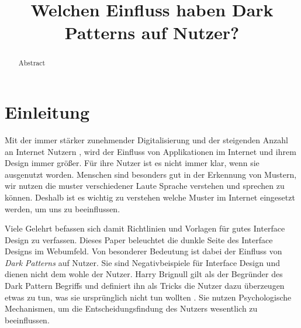 \documentclass[conference,compsoc,final,a4paper]{IEEEtran}
\newcommand{\autoren}[0]{Karhan, Marvin}
\newcommand{\dokumententitel}[0]{Welchen Einfluss haben Dark Patterns auf Nutzer?}
\begin{document}
\title{\dokumententitel}

\author{
  \IEEEauthorblockN{\autoren}
}

\maketitle
\thispagestyle{plain}
\pagestyle{plain}


\begin{abstract}
  Abstract
\end{abstract}

{\small\tableofcontents}

\section{Einleitung}
Mit der immer stärker zunehmender Digitalisierung und der steigenden Anzahl an Internet Nutzern \autocite{ITU2020}, wird der Einfluss von Applikationen im Internet und ihrem Design immer größer. Für ihre Nutzer ist es nicht immer klar, wenn sie ausgenutzt worden. Menschen sind besonders gut in der Erkennung von Mustern, wir nutzen die muster verschiedener Laute Sprache verstehen und sprechen zu können. Deshalb ist es wichtig zu verstehen welche Muster im Internet eingesetzt werden, um uns zu beeinflussen.

Viele Gelehrt befassen sich damit Richtlinien und Vorlagen für gutes Interface Design zu verfassen. Dieses Paper beleuchtet die dunkle Seite des Interface Designs im Webumfeld. Von besonderer Bedeutung ist dabei der Einfluss von \textit{Dark Patterns} auf Nutzer. Sie sind Negativbeispiele für Interface Design und dienen nicht dem wohle der Nutzer. Harry Brignull gilt als der Begründer des Dark Pattern Begriffs und definiert ihn als Tricks die Nutzer dazu überzeugen etwas zu tun, was sie ursprünglich nicht tun wollten \autocite{Brignull}. Sie nutzen Psychologische Mechanismen, um die Entscheidungsfindung des Nutzers wesentlich zu beeinflussen.
\end{document}
